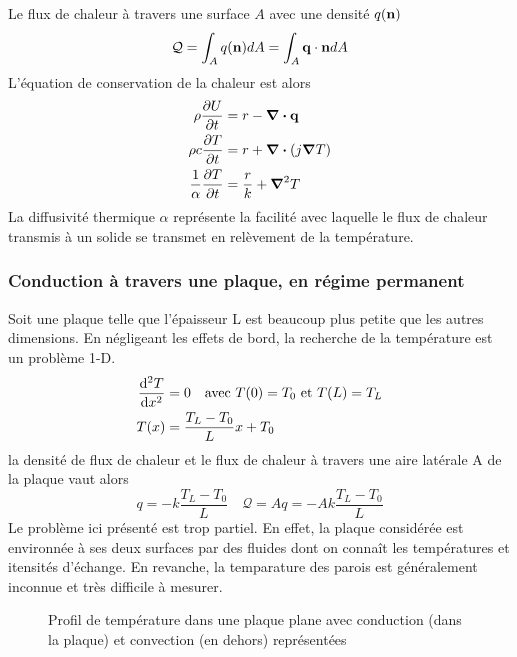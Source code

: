       Le flux de chaleur à travers une surface $A$ avec une densité $q(\vb{n})$
      \begin{equation}
        \mathcal{Q} = \int_A q(\vb{n}) dA = \int_A \vb{q} \cdot \vb{n} dA
      \end{equation}
      L'équation de conservation de la chaleur est alors
      \begin{equation}
        \begin{aligned}
          \rho \pdv{U}{t} &= r - \div \vb{q}\\
          \rho c \pdv{T}{t} &= r +  \div (j \grad T)\\
          \frac{1}{\alpha} \pdv{T}{t} &= \frac{r}{k} + \grad^2 T
        \end{aligned}
      \end{equation}
      La diffusivité thermique $\alpha$ représente la facilité avec laquelle le flux de chaleur transmis à un solide se transmet en relèvement de la température.

      \subsubsection{Conduction à travers une plaque, en régime permanent}
        Soit une plaque telle que l'épaisseur L est beaucoup plus petite que les autres dimensions. En négligeant les effets de bord, la recherche de la température est un problème 1-D.
        \begin{equation}
          \begin{aligned}
            \dv[2]{T}{x} &= 0 \quad \textrm{avec } T(0) = T_0 \textrm{ et } T(L) = T_L\\
            T(x) &= \frac{T_L - T_0}{L} x + T_0
          \end{aligned}
        \end{equation}
        la densité de flux de chaleur et le flux de chaleur à travers une aire latérale A de la plaque vaut alors
        \begin{equation}
          q = -k \frac{T_L - T_0}{L} \quad \mathcal{Q} = Aq = -A k \frac{T_L - T_0}{L}
        \end{equation}
        Le problème ici présenté est trop partiel. En effet, la plaque considérée est environnée à ses deux surfaces par des fluides dont on connaît les températures et itensités d'échange. En revanche, la temparature des parois est généralement inconnue et très difficile à mesurer.

        \begin{figure}[!h]
          \centering
          
          \caption{Profil de température dans une plaque plane avec conduction (dans la plaque) et convection (en dehors) représentées}
          \label{fig:profilTempPlane}
        \end{figure}

